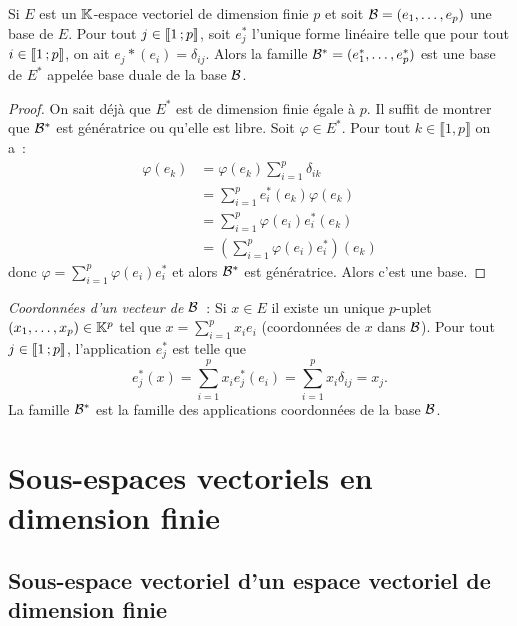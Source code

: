 \begin{prop}
  Si $E$ est un $\mathbb{K}$-espace vectoriel de dimension finie $p$ et soit $\mathcal{B}=(e_1, \ldots, e_p)$ une base de $E$. Pour tout $j \in  \mathopen{\llbracket}1\mathclose{}\mathpunct{};p\mathclose{\rrbracket}$, soit $e_j^*$ l'unique forme linéaire telle que pour tout $i \in  \mathopen{\llbracket}1\mathclose{}\mathpunct{};p\mathclose{\rrbracket}$, on ait $e_j*(e_i)=\delta_{ij}$. Alors la famille $\mathcal{B}^* = (e_1^*, \ldots, e_p^*)$ est une base de $E^*$ appelée base duale de la base $\mathcal{B}$.
\end{prop}
\begin{proof}
  On sait déjà que $E^*$ est de dimension finie égale à $p$. Il suffit de montrer que $\mathcal{B}^*$ est génératrice ou qu'elle est libre. Soit $\varphi \in E^*$. Pour tout $k \in \llbracket 1,p \rrbracket$ on a~:
  \begin{align}
    \varphi(e_k)&= \varphi(e_k) \sum_{i=1}^p \delta_{ik} \\
    &=\sum_{i=1}^p e_i^*(e_k) \varphi(e_k) \\
    &=\sum_{i=1}^p \varphi(e_i) e_i^*(e_k)  \\
    &=\left(\sum_{i=1}^p \varphi(e_i) e_i^* \right)(e_k)
  \end{align}
  donc $\varphi = \sum_{i=1}^p \varphi(e_i) e_i^*$ et alors $\mathcal{B}^*$ est génératrice. Alors c'est une base.
\end{proof}

\emph{Coordonnées d'un vecteur de $\mathcal{B}$}~: Si $x \in E$ il existe un unique $p$-uplet $(x_1, \ldots, x_p) \in \mathbb{K}^p$ tel que $x = \sum_{i=1}^p x_i e_i$ (coordonnées de $x$ dans $\mathcal{B}$). Pour tout $j \in  \mathopen{\llbracket}1\mathclose{}\mathpunct{};p\mathclose{\rrbracket}$, l'application $e_j^*$ est telle que
\begin{equation}
  e_j^*(x)=\sum_{i=1}^p x_i e_j^*(e_i) = \sum_{i=1}^p x_i \delta_{ij} = x_j.
\end{equation}
La famille $\mathcal{B}^*$ est la famille des applications coordonnées de la base $\mathcal{B}$.

\section{Sous-espaces vectoriels en dimension finie}

\subsection{Sous-espace vectoriel d'un espace vectoriel de dimension finie}

